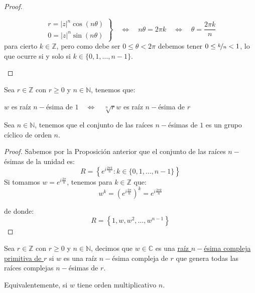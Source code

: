 \begin{prop}
\begin{proof}
\begin{description}
\begin{equation*}
                    \left.\begin{array}{l}
                        r = |z|^n \cos(n\theta) \\
                        0 = |z|^n \sin(n\theta)
                    \end{array}\right\} \quad \Longleftrightarrow\quad  n\theta = 2\pi k \quad \Longleftrightarrow\quad  \theta = \frac{2\pi k}{n}
                \end{equation*}
                para cierto $k\in \mathbb{Z}$, pero como debe ser $0\leq \theta < 2\pi$ debemos tener $0\leq \nicefrac{k}{n}< 1$, lo que ocurre si y solo si $k \in \{0,1,\ldots,n-1\}$.
        \end{description}
    \end{proof}
\end{prop}

\begin{coro}
    Sea $r\in \mathbb{Z}$ con $r\geq 0$ y $n\in \mathbb{N}$, tenemos que:
    \begin{center}
        $w$ es raíz $n-$ésima de $1 \quad\Longleftrightarrow\quad \sqrt[n]{r}w$ es raíz $n-$ésima de $r$
    \end{center}
\end{coro}

\begin{prop}
    Sea $n\in \mathbb{N}$, tenemos que el conjunto de las raíces $n-$ésimas de $1$ es un grupo cíclico de orden $n$.
    \begin{proof}
        Sabemos por la Proposición anterior que el conjunto de las raíces $n-$ésimas de la unidad es:
        \begin{equation*}
            R = \left\{e^{i\frac{2\pi k}{n}} : k\in \{0,1,\ldots,n-1\}\right\}
        \end{equation*}
        Si tomamos $w = e^{i\frac{2\pi}{n}}$, tenemos para $k\in \mathbb{Z}$ que:
        \begin{equation*}
            w^k = {\left(e^{i\frac{2\pi}{n}}\right)}^{k} = e^{i\frac{2\pi k}{n}}
        \end{equation*}

        de donde:
        \begin{equation*}
            R = \left\{1, w, w^2, \ldots, w^{n-1}\right\}
        \end{equation*}
    \end{proof}
\end{prop}

\begin{definicion}
    Sea $r\in \mathbb{Z}$ con $r\geq 0$ y $n\in \mathbb{N}$, decimos que $w\in \mathbb{C}$ es una \underline{raíz $n-$ésima compleja primitiva de $r$} si $w$ es una raíz $n-$ésima compleja de $r$ que genera todas las raíces complejas $n-$ésimas de $r$.

    \noindent
    Equivalentemente, si $w$ tiene orden multiplicativo $n$.
\end{definicion}

